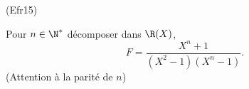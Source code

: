 \begin{tiny}(Efr15)\end{tiny} Pour $n\in \N^*$ décomposer dans $\R(X)$,
\[
 F = \frac{X^n + 1}{(X^2-1)(X^n-1)}.
\]
(Attention à la parité de $n$)
